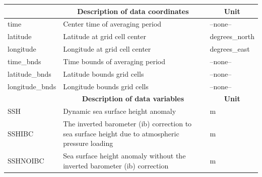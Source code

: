 \begin{longtable}{|m{}|m{}|m{}|}
\hline \endfirsthead \endhead \endfoot \hline \endlastfoot
\rowcolor{lightgray} \multicolumn{1}{|c|}{\textbf{Coordinates}} & \multicolumn{1}{|c|}{\textbf{Description of data coordinates}} &  \multicolumn{1}{|c|}{\textbf{Unit}}\\ \hline
time &Center time of averaging period &--none--  \\ \hline
latitude &Latitude at grid cell center &degrees\_north  \\ \hline
longitude &Longitude at grid cell center &degrees\_east  \\ \hline
time\_bnds &Time bounds of averaging period &--none--  \\ \hline
latitude\_bnds &Latitude bounds grid cells &--none--  \\ \hline
longitude\_bnds &Longitude bounds grid cells &--none--  \\ \hline
\rowcolor{lightgray} \multicolumn{1}{|c|}{\textbf{Variables}} & \multicolumn{1}{|c|}{\textbf{Description of data variables}} &  \multicolumn{1}{|c|}{\textbf{Unit}}\\ \hline
SSH &Dynamic sea surface height anomaly &m  \\ \hline
SSHIBC &The inverted barometer (ib) correction to sea surface height due to atmospheric pressure loading &m  \\ \hline
SSHNOIBC &Sea surface height anomaly without the inverted barometer (ib) correction &m  \\ \hline
\end{longtable}

\newp
\pagebreak
